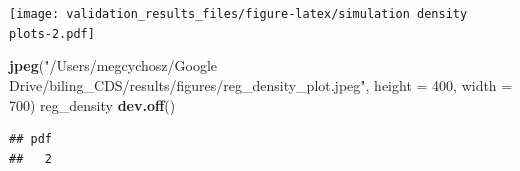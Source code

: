 \documentclass[
]{article}
\newenvironment{Shaded}{\begin{snugshade}}{\end{snugshade}}
\newcommand{\DataTypeTok}[1]{\textcolor[rgb]{0.13,0.29,0.53}{#1}}
\newcommand{\DecValTok}[1]{\textcolor[rgb]{0.00,0.00,0.81}{#1}}
\newcommand{\KeywordTok}[1]{\textcolor[rgb]{0.13,0.29,0.53}{\textbf{#1}}}
\newcommand{\NormalTok}[1]{#1}
\newcommand{\StringTok}[1]{\textcolor[rgb]{0.31,0.60,0.02}{#1}}
\begin{document}
\texttt{[image: validation\_results\_files/figure-latex/simulation density plots-2.pdf]}

\begin{Shaded}
\begin{Highlighting}[]
\KeywordTok{jpeg}\NormalTok{(}\StringTok{"/Users/megcychosz/Google Drive/biling_CDS/results/figures/reg_density_plot.jpeg"}\NormalTok{, }\DataTypeTok{height =} \DecValTok{400}\NormalTok{, }\DataTypeTok{width =} \DecValTok{700}\NormalTok{)}
\NormalTok{reg_density}
\KeywordTok{dev.off}\NormalTok{()}
\end{Highlighting}
\end{Shaded}

\begin{verbatim}
## pdf 
##   2
\end{verbatim}
\end{document}

